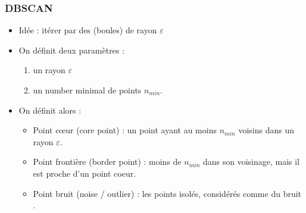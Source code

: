 
\begin{frame}
  \frametitle{DBSCAN}
  \begin{itemize}
  \item Idée : itérer  par des  (boules) de rayon $\varepsilon$
  \item On définit deux paramètres : 
  \begin{enumerate}
    \item un rayon $\varepsilon$ 
    \item un number minimal de points $n_{min}$. 
  \end{enumerate}
  \item On définit alors : 
  \begin{itemize}
    \item Point cœur (core point) : un point ayant au moins $n_{min}$ voisins dans un rayon $\varepsilon$.
    \item Point frontière (border point) : moins de $n_{min}$ dans son voisinage, mais il est proche d’un point coeur.
    \item Point bruit (noise / outlier) : les points isolés, considérés comme du bruit .
  \end{itemize}
\end{itemize}
\end{frame}

